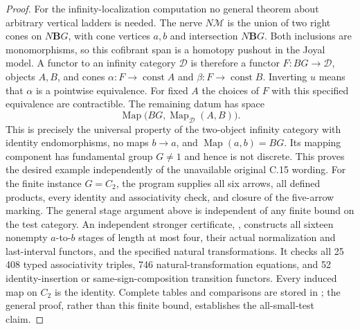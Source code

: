 \begin{proof}
For the infinity-localization computation no general theorem about
arbitrary vertical ladders is needed.  The nerve $N\mathcal M$ is
the union of two right cones on $N\mathbf BG$, with cone vertices
$a,b$ and intersection $N\mathbf BG$.  Both inclusions are
monomorphisms, so this cofibrant span is a homotopy pushout in the
Joyal model.  A functor to an infinity category $\mathcal D$ is
therefore a functor $F:BG\to\mathcal D$, objects $A,B$, and cones
$\alpha:F\to\operatorname{const}A$ and
$\beta:F\to\operatorname{const}B$.  Inverting $u$ means that
$\alpha$ is a pointwise equivalence.  For fixed $A$ the choices
of $F$ with this specified equivalence are contractible.  The
remaining datum has space
\[
 \operatorname{Map}\bigl(BG,\operatorname{Map}_{\mathcal D}(A,B)\bigr).
\]
This is precisely the universal property of the two-object infinity
category with identity endomorphisms, no maps $b\to a$, and
$\operatorname{Map}(a,b)=BG$.  Its mapping component has fundamental
group $G\ne1$ and hence is not discrete.  This proves the desired
example independently of the unavailable original C.15 wording.
For the finite instance $G=C_2$, the program
 supplies all six arrows,
all defined products, every identity and associativity check, and
closure of the five-arrow marking. The general stage argument above
is independent of any finite bound on the test category.
An independent stronger certificate,
, constructs all sixteen
nonempty $a$-to-$b$ stages of length at most four, their actual
normalization and last-interval functors, and the specified natural
transformations. It checks all 25\,408 typed associativity triples,
746 natural-transformation equations, and 52 identity-insertion or
same-sign-composition transition functors. Every induced map on
$C_2$ is the identity. Complete tables and comparisons are stored in
; the general proof,
rather than this finite bound, establishes the all-small-test claim.
\end{proof}
